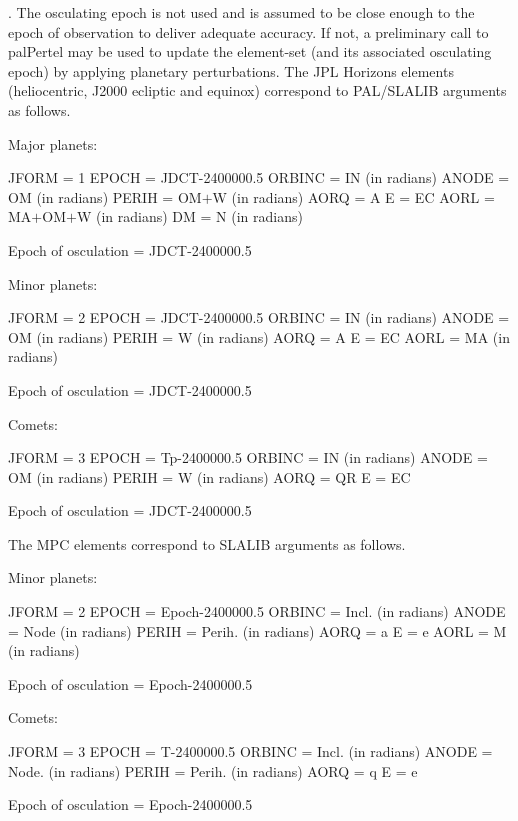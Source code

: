 \documentclass[twoside,11pt,nolof]{starlink}
\begin{document}
{{        . The osculating epoch is not used and is assumed to be close
          enough to the epoch of observation to deliver adequate accuracy.
          If not, a preliminary call to palPertel may be used to update
          the element-set (and its associated osculating epoch) by
          applying planetary perturbations.
        The JPL Horizons elements (heliocentric, J2000 ecliptic and
        equinox) correspond to PAL/SLALIB arguments as follows.

         Major planets:

          JFORM  = 1
          EPOCH  = JDCT-2400000.5
          ORBINC = IN (in radians)
          ANODE  = OM (in radians)
          PERIH  = OM$+$W (in radians)
          AORQ   = A
          E      = EC
          AORL   = MA$+$OM$+$W (in radians)
          DM     = N (in radians)

          Epoch of osculation = JDCT-2400000.5

         Minor planets:

          JFORM  = 2
          EPOCH  = JDCT-2400000.5
          ORBINC = IN (in radians)
          ANODE  = OM (in radians)
          PERIH  = W (in radians)
          AORQ   = A
          E      = EC
          AORL   = MA (in radians)

          Epoch of osculation = JDCT-2400000.5

         Comets:

          JFORM  = 3
          EPOCH  = Tp-2400000.5
          ORBINC = IN (in radians)
          ANODE  = OM (in radians)
          PERIH  = W (in radians)
          AORQ   = QR
          E      = EC

          Epoch of osculation = JDCT-2400000.5

       The MPC elements correspond to SLALIB arguments as follows.

         Minor planets:

          JFORM  = 2
          EPOCH  = Epoch-2400000.5
          ORBINC = Incl. (in radians)
          ANODE  = Node (in radians)
          PERIH  = Perih. (in radians)
          AORQ   = a
          E      = e
          AORL   = M (in radians)

          Epoch of osculation = Epoch-2400000.5

        Comets:

          JFORM  = 3
          EPOCH  = T-2400000.5
          ORBINC = Incl. (in radians)
          ANODE  = Node. (in radians)
          PERIH  = Perih. (in radians)
          AORQ   = q
          E      = e

          Epoch of osculation = Epoch-2400000.5
   }
}
\end{document}
